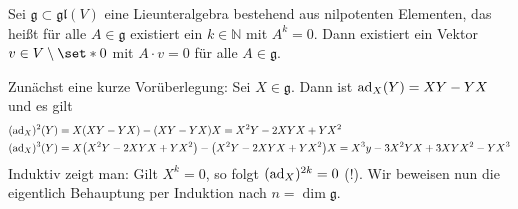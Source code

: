 \begin{lemma}[label=lem:217,{name=[Lieunteralgebra als nilpotenten Elementen]}]
	Sei $\mathfrak{g} \subset \mathfrak{gl}(V)$ eine Lieunteralgebra bestehend aus nilpotenten Elementen, das heißt für alle $A \in \mathfrak{g}$ existiert ein $k \in \mathbb{N}$ mit $A^k=0$.
	Dann existiert ein Vektor $v \in V \setminus \set*{0}$ mit $A \cdot v = 0$ für alle $A \in \mathfrak{g}$.
\end{lemma}
\begin{beweis}
	Zunächst eine kurze Vorüberlegung: Sei $X \in \mathfrak{g}$. Dann ist $\operatorname{ad}_X(Y) = X Y -Y X$ und es gilt
	\begin{align}
		(\ad_X)^2(Y) &= X \enbrace*{X Y -YX} - \enbrace*{XY -YX}X = X^2 Y - 2XYX+ YX^2 \\
		(\ad_X)^3(Y) &= X \enbrace*{X^2 Y - 2XYX+ YX^2}- \enbrace*{X^2 Y - 2XYX+ YX^2}X
		= X^3 y - 3 X^2YX+3 XYX^2 - YX^3
	\end{align}
	Induktiv zeigt man: Gilt $X^k=0$, so folgt $(\operatorname{ad}_X)^{2k}=0$ (!).
	Wir beweisen nun die eigentlich Behauptung per Induktion nach $n = \dim \mathfrak{g}$.
	

\end{beweis}
